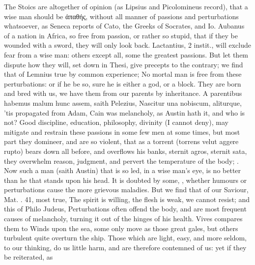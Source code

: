 {{The Stoics are altogether of opinion (as Lipsius and
Picolomineus record), that a wise man should be \textgreek{ἀπαθής}, without
all manner of passions and perturbations whatsoever, as Seneca
reports of Cato, the  Greeks of Socrates, and Io. Aubanus
of a nation in Africa, so free from passion, or rather so stupid, that
if they be wounded with a sword, they will only look back.
Lactantius, 2 instit., will exclude fear from a wise man: others
except all, some the greatest passions. But let them dispute how they
will, set down in Thesi, give precepts to the contrary; we find that of
Lemnius true by common experience; No mortal man is free from
these perturbations: or if he be so, sure he is either a god, or a
block. They are born and bred with us, we have them from our parents by
inheritance. A parentibus habemus malum hunc assem, saith
Pelezius, Nascitur una nobiscum, aliturque, 'tis propagated from
Adam, Cain was melancholy, as Austin hath it, and who is not?
Good discipline, education, philosophy, divinity (I cannot deny), may
mitigate and restrain these passions in some few men at some times, but
most part they domineer, and are so violent, that as a torrent
(torrens velut aggere rupto) bears down all before, and overflows his
banks, sternit agros, sternit sata}, they overwhelm reason, judgment, and pervert the
temperature of the body; . Now such a man (saith Austin) that is so led, in a wise
man's eye, is no better than he that stands upon his head. It is
doubted by some, ,
whether humours or perturbations cause the more grievous maladies. But
we find that of our Saviour, Mat. . 41, most true, The spirit is
willing, the flesh is weak, we cannot resist; and this of Philo
Judeus, Perturbations often offend the body, and are most frequent
causes of melancholy, turning it out of the hinges of his health. Vives
compares them to Winds upon the sea, some only move as those
great gales, but others turbulent quite overturn the ship. Those which
are light, easy, and more seldom, to our thinking, do us little harm,
and are therefore contemned of us: yet if they be reiterated, as
}
